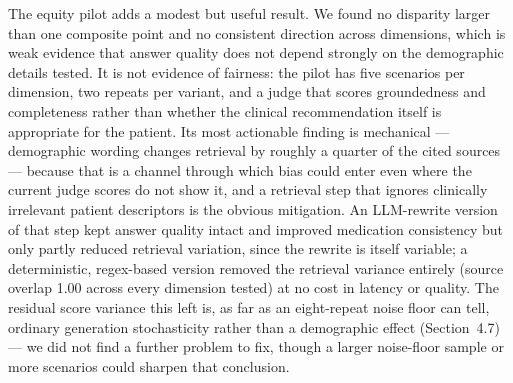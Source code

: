 \documentclass[11pt]{article}
\begin{document}
The equity pilot adds a modest but useful result. We found no disparity larger than one composite point and no consistent direction across dimensions, which is weak evidence that answer quality does not depend strongly on the demographic details tested. It is not evidence of fairness: the pilot has five scenarios per dimension, two repeats per variant, and a judge that scores groundedness and completeness rather than whether the clinical recommendation itself is appropriate for the patient. Its most actionable finding is mechanical --- demographic wording changes retrieval by roughly a quarter of the cited sources --- because that is a channel through which bias could enter even where the current judge scores do not show it, and a retrieval step that ignores clinically irrelevant patient descriptors is the obvious mitigation. An LLM-rewrite version of that step kept answer quality intact and improved medication consistency but only partly reduced retrieval variation, since the rewrite is itself variable; a deterministic, regex-based version removed the retrieval variance entirely (source overlap 1.00 across every dimension tested) at no cost in latency or quality. The residual score variance this left is, as far as an eight-repeat noise floor can tell, ordinary generation stochasticity rather than a demographic effect (Section~4.7) --- we did not find a further problem to fix, though a larger noise-floor sample or more scenarios could sharpen that conclusion.
\end{document}
